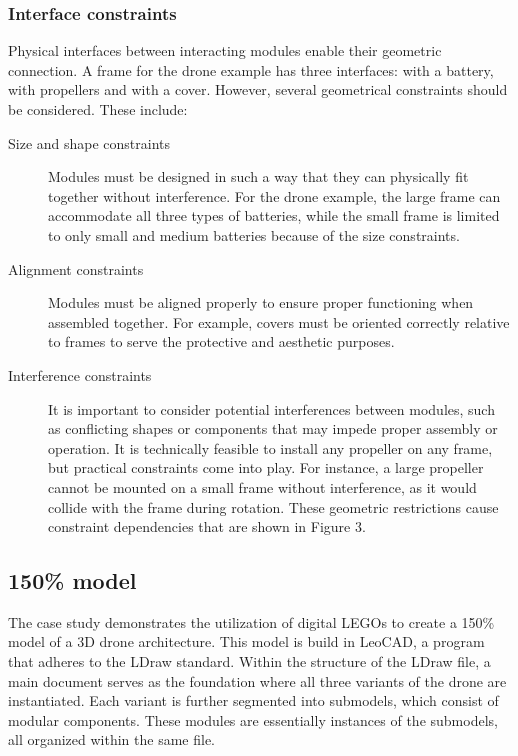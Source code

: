 \documentclass[sigconf,review]{acmart}
\begin{document}
\subsubsection{Interface constraints}

Physical interfaces between interacting modules enable their geometric connection. A frame for the drone example has three interfaces: with a battery, with propellers and with a cover. 
However, several geometrical constraints should be considered. These include:

\begin{description}
    \item[Size and shape constraints] Modules must be designed in such a way that they can physically fit together without interference. 
For the drone example, the large frame can accommodate all three types of batteries, while the small frame is limited to only small and medium batteries because of the size constraints.
    \item[Alignment constraints] Modules must be aligned properly to ensure proper functioning when assembled together. 
For example, covers must be oriented correctly relative to frames to serve the protective and aesthetic purposes. 
    \item[Interference constraints] It is important to consider potential interferences between modules, such as conflicting shapes or components that may impede proper assembly or operation. 
It is technically feasible to install any propeller on any frame, but practical constraints come into play. For instance, a large propeller cannot be mounted on a small frame without interference, as it would collide with the frame during rotation.
These geometric restrictions cause constraint dependencies that are shown in Figure 3.
\end{description}

\subsection{150\% model}
\label{sec:150-model}

The case study demonstrates the utilization of digital LEGOs to create a 150\% model of a 3D drone architecture. 
This model is build in LeoCAD, a program that adheres to the LDraw standard. 
Within the structure of the LDraw file, a main document serves as the foundation where all three variants of the drone are instantiated. 
Each variant is further segmented into submodels, which consist of modular components. 
These modules are essentially instances of the submodels, all organized within the same file.
\end{document}
